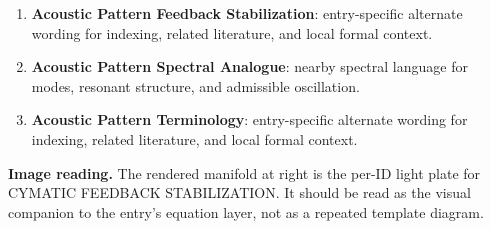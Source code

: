 \begin{enumerate}[leftmargin=1.6em,itemsep=6pt,topsep=4pt]
\item \textbf{Acoustic Pattern Feedback Stabilization}: entry-specific alternate wording for indexing, related literature, and local formal context.
\item \textbf{Acoustic Pattern Spectral Analogue}: nearby spectral language for modes, resonant structure, and admissible oscillation.
\item \textbf{Acoustic Pattern Terminology}: entry-specific alternate wording for indexing, related literature, and local formal context.
\end{enumerate}

\begin{samepage}
\noindent\begin{minipage}[t]{0.45\linewidth}
\vspace{0pt}
\raggedright
\scriptsize\textbf{Image reading.} The rendered manifold at right is the per-ID light plate for CYMATIC FEEDBACK STABILIZATION. It should be read as the visual companion to the entry's equation layer, not as a repeated template diagram.\par
\end{minipage}\hfill
\begin{minipage}[t]{0.53\linewidth}
\vspace*{-0.10in}
\raggedright
{}
\end{minipage}
\end{samepage}

\clearpage


